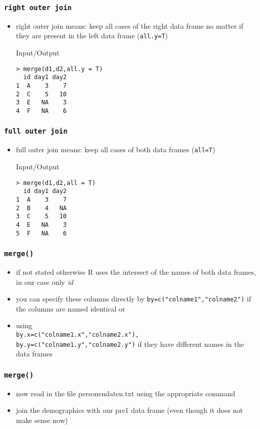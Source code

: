 \documentclass[xcolor={table},c]{beamer}
\begin{document}
\begin{frame}[fragile]\frametitle{\texttt{right outer join}}
\begin{itemize}
\item right outer join means: keep all cases of the right data frame no matter if they are present in the left data frame (\texttt{all.y=T})
  \begin{exampleblock}{Input/Output}\small
\begin{verbatim}
> merge(d1,d2,all.y = T)
  id day1 day2
1  A    3    7
2  C    5   10
3  E   NA    3
4  F   NA    6
\end{verbatim}
  \end{exampleblock}
\end{itemize}
\end{frame}


\begin{frame}[fragile]\frametitle{\texttt{full outer join}}
\begin{itemize}
\item full outer join means: keep all cases of both data frames (\texttt{all=T})
  \begin{exampleblock}{Input/Output}\small
\begin{verbatim}
> merge(d1,d2,all = T)
  id day1 day2
1  A    3    7
2  B    4   NA
3  C    5   10
4  E   NA    3
5  F   NA    6
\end{verbatim}
  \end{exampleblock}
\end{itemize}
\end{frame}

\begin{frame}[fragile]\frametitle{\texttt{merge()}}
\begin{itemize}
\item if not stated otherwise R uses the intersect of the names of both data frames, in our case only \textit{id}
\item you can specify these columns directly by \texttt{by=c("colname1","colname2")} if the columns are named identical or
\item using\\ \texttt{by.x=c("colname1.x","colname2.x"),
by.y=c("colname1.y","colname2.y")} if they have different names in the data frames
\end{itemize}
\end{frame}


\begin{frame}[fragile]\frametitle{\texttt{merge()}}
\begin{itemize}
\item now read in the file personendaten.txt using the appropriate command
\item join the demographics with our pre1 data frame (even though it does not make sense now)
\end{itemize}
\end{frame}
\end{document}
